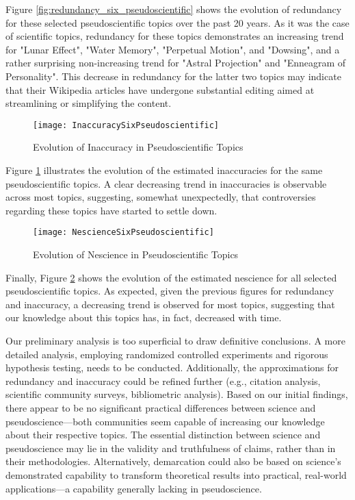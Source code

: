 Figure \ref{fig:redundancy_six_pseudoscientific} shows the evolution of redundancy for these selected pseudoscientific topics over the past 20 years. As it was the case of scientific topics, redundancy for these topics demonstrates an increasing trend for "Lunar Effect", "Water Memory", "Perpetual Motion", and "Dowsing", and a rather surprising non-increasing trend for "Astral Projection" and "Enneagram of Personality". This decrease in redundancy for the latter two topics may indicate that their Wikipedia articles have undergone substantial editing aimed at streamlining or simplifying the content.

\begin{figure}[H]
\centering\texttt{[image: InaccuracySixPseudoscientific]}
\caption{\label{fig:inaccuracy_six_pseudoscientific}Evolution of Inaccuracy in Pseudoscientific Topics}
\end{figure}

Figure \ref{fig:inaccuracy_six_pseudoscientific} illustrates the evolution of the estimated inaccuracies for the same pseudoscientific topics. A clear decreasing trend in inaccuracies is observable across most topics, suggesting, somewhat unexpectedly, that controversies regarding these topics have started to settle down. 

\begin{figure}[H]
\centering\texttt{[image: NescienceSixPseudoscientific]}
\caption{\label{fig:nescience_six_pseudoscientific}Evolution of Nescience in Pseudoscientific Topics}
\end{figure}

Finally, Figure \ref{fig:nescience_six_pseudoscientific} shows the evolution of the estimated nescience for all selected pseudoscientific topics. As expected, given the previous figures for redundancy and inaccuracy, a decreasing trend is observed for most topics, suggesting that our knowledge about this topics has, in fact, decreased with time.

Our preliminary analysis is too superficial to draw definitive conclusions. A more detailed analysis, employing randomized controlled experiments and rigorous hypothesis testing, needs to be conducted. Additionally, the approximations for redundancy and inaccuracy could be refined further (e.g., citation analysis, scientific community surveys, bibliometric analysis). Based on our initial findings, there appear to be no significant practical differences between science and pseudoscience—both communities seem capable of increasing our knowledge about their respective topics. The essential distinction between science and pseudoscience may lie in the validity and truthfulness of claims, rather than in their methodologies. Alternatively, demarcation could also be based on science's demonstrated capability to transform theoretical results into practical, real-world applications—a capability generally lacking in pseudoscience.


